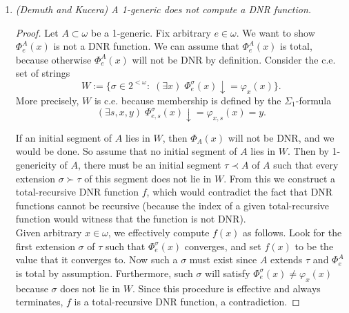 \documentclass{article}
\begin{document}
\begin{enumerate}
  \item \it (Demuth and Kucera) A 1-generic does not compute a DNR
    function.

    \begin{proof}
      Let $A\subset\omega$ be a 1-generic. Fix arbitrary $e\in\omega$. We
      want to show $\Phi^A_e(x)$ is not a DNR function. We can assume that
      $\Phi^A_e(x)$ is total, because otherwise $\Phi^A_e(x)$ will not be
      DNR by definition. Consider the c.e. set of strings
      \[W :=\{\sigma\in2^{<\omega}:\; (\exists x)\;
      \Phi_e^\sigma(x) \downarrow= \varphi_x(x)\}.\]
      More precisely, $W$ is c.e. because membership is defined
      by the $\Sigma_1$-formula
      \[(\exists s,x,y)\; \Phi_{e,s}^\sigma(x) \downarrow=
      \varphi_{x,s}(x)=y.\]

      If an initial segment of $A$ lies in $W$, then $\Phi_A(x)$ will not
      be DNR, and we would be done. So assume that no initial segment of
      $A$ lies in $W$. Then by 1-genericity of $A$, there must be an
      initial segment $\tau\prec A$ of $A$ such that every extension
      $\sigma\succ\tau$ of this segment does not lie in
      $W$. From this we construct a total-recursive DNR function $f$,
      which would contradict the fact that DNR functions cannot be
      recursive (because the index of a given total-recursive function
      would witness that the function is not DNR). \\

      Given arbitrary $x\in\omega$, we effectively
      compute $f(x)$ as follows. Look for the first extension $\sigma$ of
      $\tau$ such that $\Phi^\sigma_e(x)$ converges, and set $f(x)$ to be
      the value that it converges to. Now such a $\sigma$ must exist
      since $A$ extends $\tau$ and $\Phi^A_e$ is total by assumption.
      Furthermore, such $\sigma$ will satisfy
      $\Phi^\sigma_e(x)\neq\varphi_x(x)$ because $\sigma$ does not lie in
      $W$. Since this procedure is effective and always terminates, $f$ is
      a total-recursive DNR function, a contradiction.
    \end{proof}
\end{enumerate}
\end{document}
